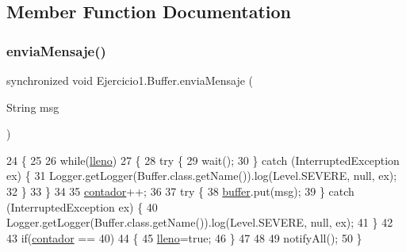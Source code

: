 \subsection{Member Function Documentation}
\mbox{\label{class_ejercicio1_1_1_buffer_ae8a567959dc32c3965d89f487e2b889f}} 
\subsubsection{\texorpdfstring{envia\+Mensaje()}{enviaMensaje()}}
{\footnotesize\ttfamily synchronized void Ejercicio1.\+Buffer.\+envia\+Mensaje (\begin{DoxyParamCaption}\item[{String}]{msg }\end{DoxyParamCaption})\hspace{0.3cm}{\ttfamily [inline]}}


\begin{DoxyCode}
24     \{
25         
26         \textcolor{keywordflow}{while}(\mbox{\hyperlink{class_ejercicio1_1_1_buffer_ac31a3784041537125eb245e82a5dcc8f}{lleno}})
27         \{
28             \textcolor{keywordflow}{try} \{
29                 wait();
30             \} \textcolor{keywordflow}{catch} (InterruptedException ex) \{
31                 Logger.getLogger(Buffer.class.getName()).log(Level.SEVERE, null, ex);
32             \}
33         \}
34         
35         \mbox{\hyperlink{class_ejercicio1_1_1_buffer_a2d253914c2d2e673971f0486f0499e82}{contador}}++;
36         
37         \textcolor{keywordflow}{try} \{
38             \mbox{\hyperlink{class_ejercicio1_1_1_buffer_a8aac505cb8d56d8242ef65e0701079bf}{buffer}}.put(msg);
39         \} \textcolor{keywordflow}{catch} (InterruptedException ex) \{
40             Logger.getLogger(Buffer.class.getName()).log(Level.SEVERE, null, ex);
41         \}
42         
43         \textcolor{keywordflow}{if}(\mbox{\hyperlink{class_ejercicio1_1_1_buffer_a2d253914c2d2e673971f0486f0499e82}{contador}} == 40)
44         \{
45             \mbox{\hyperlink{class_ejercicio1_1_1_buffer_ac31a3784041537125eb245e82a5dcc8f}{lleno}}=\textcolor{keyword}{true};
46         \}
47         
48         
49         notifyAll();
50     \}
\end{DoxyCode}
\mbox{\label{class_ejercicio1_1_1_buffer_a534af142b15755b1e0d4c6511e37683b}} 

